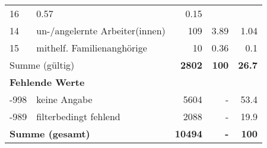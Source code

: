 \begin{longtable}{lXrrr}
       \num{16} &
       \num[round-mode=places,round-precision=2]{0.57} &
         \num[round-mode=places,round-precision=2]{0.15} \\

     14 &
     \multicolumn{1}{X}{ un-/angelernte Arbeiter(innen)   } &


       \num{109} &
       \num[round-mode=places,round-precision=2]{3.89} &
         \num[round-mode=places,round-precision=2]{1.04} \\

     15 &
     \multicolumn{1}{X}{ mithelf. Familienanghörige   } &


       \num{10} &
       \num[round-mode=places,round-precision=2]{0.36} &
         \num[round-mode=places,round-precision=2]{0.1} \\
     \midrule
     \multicolumn{2}{l}{Summe (gültig)} &
       \textbf{\num{2802}} &
     \textbf{\num{100}} &
       \textbf{\num[round-mode=places,round-precision=2]{26.7}} \\
     \multicolumn{5}{l}{\textbf{Fehlende Werte}}\\
       -998 &
       keine Angabe &
         \num{5604} &
        - &
         \num[round-mode=places,round-precision=2]{53.4} \\
       -989 &
       filterbedingt fehlend &
         \num{2088} &
        - &
         \num[round-mode=places,round-precision=2]{19.9} \\
     \midrule
     \multicolumn{2}{l}{\textbf{Summe (gesamt)}} &
          \textbf{\num{10494}} &
        \textbf{-} &
        \textbf{\num{100}} \\
     \bottomrule
     \end{longtable}
     
